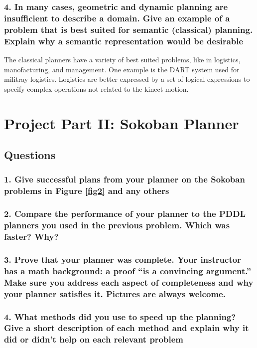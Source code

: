 \documentclass[10pt, letter]{article}
\begin{document}
\subsubsection*{4. In many cases, geometric and dynamic planning are insufficient to describe a domain. Give
an example of a problem that is best suited for semantic (classical) planning. Explain why a
semantic representation would be desirable}

The classical planners have a variety of best suited problems, like in logistics, manofacturing, and management. One example is the DART system used for militray logistics. Logistics are better expressed by a set of logical expressions to specify complex operations not related to the kinect motion.


\section{Project Part II: Sokoban Planner}
\subsection{Questions}
\subsubsection*{1. Give successful plans from your planner on the Sokoban problems in Figure \ref{fig2} and any others}
\subsubsection*{2. Compare the performance of your planner to the PDDL planners you used in the previous
problem. Which was faster? Why?}
\subsubsection*{3. Prove that your planner was complete. Your instructor has a math background: a proof ``is
a convincing argument.'' Make sure you address each aspect of completeness and why your
planner satisfies it. Pictures are always welcome.}
\subsubsection*{4. What methods did you use to speed up the planning? Give a short description of each method
and explain why it did or didn't help on each relevant problem}
\end{document}
